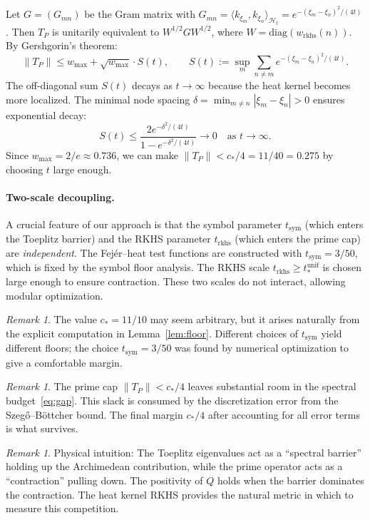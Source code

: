 \documentclass[11pt,a4paper]{article}
\theoremstyle{definition}
\theoremstyle{remark}
\newtheorem{remark}[theorem]{Remark}
\begin{document}
Let $G = (G_{mn})$ be the Gram matrix with $G_{mn} = \langle k_{\xi_m}, k_{\xi_n} \rangle_{\mathcal{H}_t} = e^{-(\xi_m - \xi_n)^2/(4t)}$. Then $T_P$ is unitarily equivalent to $W^{1/2} G W^{1/2}$, where $W = \mathrm{diag}(w_{\mathrm{rkhs}}(n))$. By Gershgorin's theorem:
\[
  \|T_P\| \leq w_{\max} + \sqrt{w_{\max}} \cdot S(t), \qquad
  S(t) := \sup_m \sum_{n \neq m} e^{-(\xi_m - \xi_n)^2/(4t)}.
\]
The off-diagonal sum $S(t)$ decays as $t \to \infty$ because the heat kernel becomes more localized. The minimal node spacing $\delta = \min_{m \neq n} |\xi_m - \xi_n| > 0$ ensures exponential decay:
\[
  S(t) \leq \frac{2e^{-\delta^2/(4t)}}{1 - e^{-\delta^2/(4t)}} \to 0 \quad \text{as } t \to \infty.
\]
Since $w_{\max} = 2/e \approx 0.736$, we can make $\|T_P\| < c_*/4 = 11/40 = 0.275$ by choosing $t$ large enough.

\paragraph{Two-scale decoupling.}
A crucial feature of our approach is that the symbol parameter $t_{\mathrm{sym}}$ (which enters the Toeplitz barrier) and the RKHS parameter $t_{\mathrm{rkhs}}$ (which enters the prime cap) are \emph{independent}. The Fej\'er--heat test functions are constructed with $t_{\mathrm{sym}} = 3/50$, which is fixed by the symbol floor analysis. The RKHS scale $t_{\mathrm{rkhs}} \geq t_*^{\mathrm{unif}}$ is chosen large enough to ensure contraction. These two scales do not interact, allowing modular optimization.

\begin{remark}\label{rem:cstar}
The value $c_* = 11/10$ may seem arbitrary, but it arises naturally from the explicit computation in Lemma~\ref{lem:floor}. Different choices of $t_{\mathrm{sym}}$ yield different floors; the choice $t_{\mathrm{sym}} = 3/50$ was found by numerical optimization to give a comfortable margin.
\end{remark}

\begin{remark}\label{rem:slack}
The prime cap $\|T_P\| < c_*/4$ leaves substantial room in the spectral budget~\eqref{eq:gap}. This slack is consumed by the discretization error from the Szeg\H{o}--B\"ottcher bound. The final margin $c_*/4$ after accounting for all error terms is what survives.
\end{remark}

\begin{remark}\label{rem:physics}
Physical intuition: The Toeplitz eigenvalues act as a ``spectral barrier'' holding up the Archimedean contribution, while the prime operator acts as a ``contraction'' pulling down. The positivity of $Q$ holds when the barrier dominates the contraction. The heat kernel RKHS provides the natural metric in which to measure this competition.
\end{remark}
\end{document}
